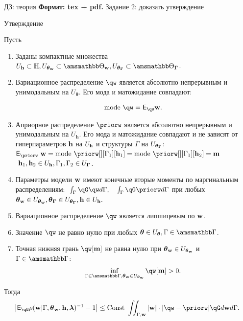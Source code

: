 \documentclass[10pt,pdf,utf8,russian,aspectratio=169]{beamer}
\begin{document}
\begin{frame}{ДЗ: теория}
\tiny
\textbf{Формат: tex + pdf.}
Задание 2: доказать утверждение
\begin{block}{Утверждение}

Пусть
\begin{enumerate}
\item Заданы компактные множества $\Uh \subset \Hb, \Utetaw \subset \Tetawb, \UtetaG \subset \TetaGb$.

\item Вариационное распределение $\qw$  является абсолютно непрерывным и унимодальным на  $U_{\boldsymbol{\theta}}$.
Его мода и матожидание совпадают:

\[
  \text{mode}~\qw = \E_{\qw} \w.
\]




\item Априорное распределение $\priorw$ является абсолютно непрерывным и унимодальным на  $U_\mathbf{h}$. Его мода и матожидание совпадают и не зависят от гиперпараметров $\mathbf{h}$  на $U_{\mathbf{h}}$ и структуры $\Gamma$ на $U_{\boldsymbol{\theta}_{\boldsymbol{\Gamma}}}$:
$
\E_{\priorw}~\w = \text{mode}~\priorw[][\Gamma_1][\h_1]=\text{mode}~\priorw[][\Gamma_1][\h_2]=\mathbf{m}
$
$~\mathbf{h}_1,\mathbf{h}_2 \in U_{\mathbf{h}}, \Gamma_1,\Gamma_2 \in U_{\boldsymbol{\Gamma}}$.


\item Параметры модели $\mathbf{w}$ имеют конечные вторые моменты по маргинальным распределениям:
$
   \int_{\Gamma}\qG\qw d\Gamma, \quad \int_{\Gamma}\qG\priorw d\Gamma
$
при любых $\boldsymbol{\theta}_\mathbf{w} \in U_{\boldsymbol{\theta}_\mathbf{w}}, \boldsymbol{\theta}_{\boldsymbol{\Gamma}} \in U_{\boldsymbol{\theta}_{\boldsymbol{\Gamma}}}, \mathbf{h} \in U_{\mathbf{h}}.$


\item Вариационное распределение $\qw$ является липшицевым по $\mathbf{w}$.

\item Значение $\qw$ не равно нулю при любых $\teta \in \Uteta, \Gamma \in \Gb$.

\item Точная нижняя грань $\qw[\mathbf{m}]$ не равна нулю при $\boldsymbol{\theta}_\mathbf{w} \in U_{\boldsymbol{\theta}_\mathbf{w}}$ и $\Gamma \in \Gb$:
\[
    \inf_{\Gamma \in \Gb, \tetaw \in \Utetaw} \qw[\mathbf{m}] > 0.
\]
\end{enumerate}
Тогда 
\[
   \left|\E_{\qG} {\rho}(\w|\Gamma, \tetaw, \h, \lam)^{-1} - 1\right| 
\leq \text{Const } \iint_{\Gamma,\w} |\w| \cdot |\qw - \priorw|\qG d\w d\Gamma.
\]
\end{block}
\end{frame}
\end{document}
